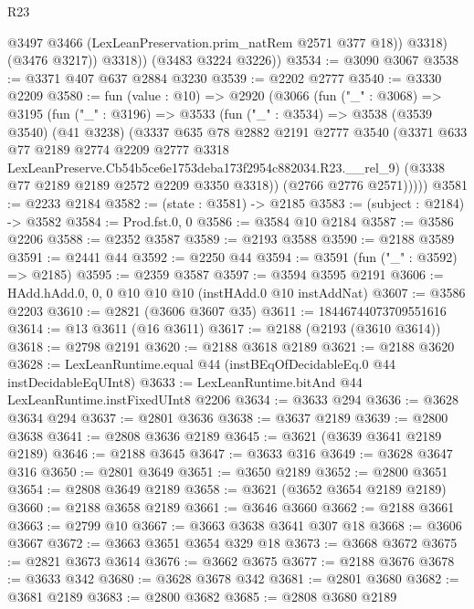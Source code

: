 \begin{lexlean}{R23}
\begin{coremodule}
                @3497
                @3466
                (LexLeanPreservation.prim_natRem @2571 @377 @18))
              @3318)
            (@3476 @3217))
          @3318))
      (@3483 @3224 @3226))
@3534 := @3090 @3067
@3538 := @3371 @407 @637 @2884 @3230
@3539 := @2202 @2777
@3540 := @3330 @2209
@3580 := fun (value : @10) =>
  @2920
    (@3066
      (fun ("_" : @3068) =>
      @3195
        (fun ("_" : @3196) =>
        @3533
          (fun ("_" : @3534) =>
          @3538
            (@3539 @3540)
            (@41 @3238)
            (@3337
              @635
              @78
              @2882
              @2191
              @2777
              @3540
              (@3371
                @633
                @77
                @2189
                @2774
                @2209
                @2777
                @3318
                LexLeanPreserve.Cb54b5ce6e1753deba173f2954c882034.R23.__rel_9)
              (@3338 @77 @2189 @2189 @2572 @2209 @3350 @3318))
            (@2766 @2776 @2571)))))
@3581 := @2233 @2184
@3582 := (state : @3581) -> @2185
@3583 := (subject : @2184) -> @3582
@3584 := Prod.fst.{0, 0}
@3586 := @3584 @10 @2184
@3587 := @3586 @2206
@3588 := @2352 @3587
@3589 := @2193 @3588
@3590 := @2188 @3589
@3591 := @2441 @44
@3592 := @2250 @44
@3594 := @3591 (fun ("_" : @3592) => @2185)
@3595 := @2359 @3587
@3597 := @3594 @3595 @2191
@3606 := HAdd.hAdd.{0, 0, 0} @10 @10 @10 (instHAdd.{0} @10 instAddNat)
@3607 := @3586 @2203
@3610 := @2821 (@3606 @3607 @35)
@3611 := 18446744073709551616
@3614 := @13 @3611 (@16 @3611)
@3617 := @2188 (@2193 (@3610 @3614))
@3618 := @2798 @2191
@3620 := @2188 @3618 @2189
@3621 := @2188 @3620
@3628 := LexLeanRuntime.equal @44 (instBEqOfDecidableEq.{0} @44 instDecidableEqUInt8)
@3633 := LexLeanRuntime.bitAnd @44 LexLeanRuntime.instFixedUInt8 @2206
@3634 := @3633 @294
@3636 := @3628 @3634 @294
@3637 := @2801 @3636
@3638 := @3637 @2189
@3639 := @2800 @3638
@3641 := @2808 @3636 @2189
@3645 := @3621 (@3639 @3641 @2189 @2189)
@3646 := @2188 @3645
@3647 := @3633 @316
@3649 := @3628 @3647 @316
@3650 := @2801 @3649
@3651 := @3650 @2189
@3652 := @2800 @3651
@3654 := @2808 @3649 @2189
@3658 := @3621 (@3652 @3654 @2189 @2189)
@3660 := @2188 @3658 @2189
@3661 := @3646 @3660
@3662 := @2188 @3661
@3663 := @2799 @10
@3667 := @3663 @3638 @3641 @307 @18
@3668 := @3606 @3667
@3672 := @3663 @3651 @3654 @329 @18
@3673 := @3668 @3672
@3675 := @2821 @3673 @3614
@3676 := @3662 @3675
@3677 := @2188 @3676
@3678 := @3633 @342
@3680 := @3628 @3678 @342
@3681 := @2801 @3680
@3682 := @3681 @2189
@3683 := @2800 @3682
@3685 := @2808 @3680 @2189

\end{coremodule}
\end{lexlean}
